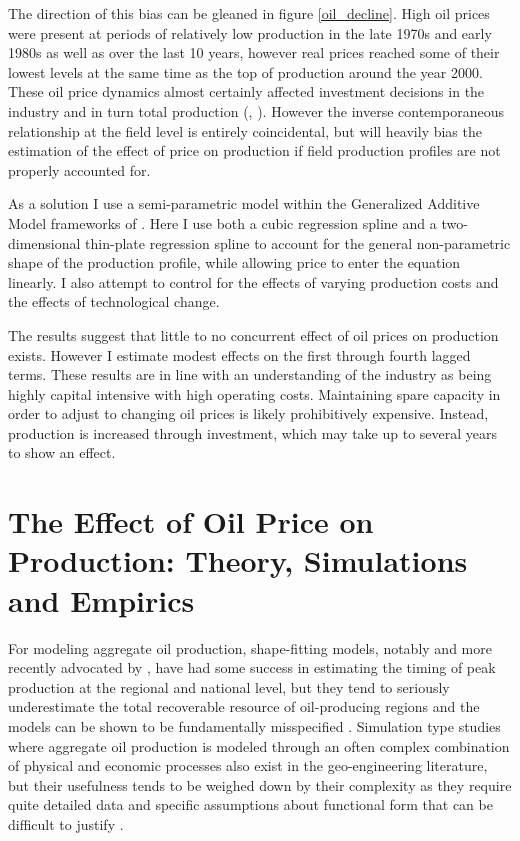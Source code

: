 \documentclass[11pt]{article}
\begin{document}
The direction of this bias can be gleaned in figure \ref{oil_decline}.  High oil prices were present at periods of relatively low production in the late 1970s and early 1980s as well as over the last 10 years, however real prices reached some of their lowest levels at the same time as the top of production around the year 2000. These oil price dynamics almost certainly affected investment decisions in the industry and in turn total production (\citep{osmundsen_is_2007}, \citep{aune_financial_2010}). However the inverse contemporaneous relationship at the field level is entirely coincidental, but will heavily bias the estimation of the effect of price on production if field production profiles are not properly accounted for. 

As a solution I use a semi-parametric model within the Generalized Additive Model frameworks of \cite{hastie_generalized_1990}.  Here I use both a cubic regression spline and a two-dimensional thin-plate regression spline to account for the general non-parametric shape of the production profile, while allowing price to enter the equation linearly. I also attempt to control for the effects of varying production costs and the effects of technological change.

The results suggest that little to no concurrent effect of oil prices on production exists.  However I estimate modest effects on the first through fourth lagged terms. These results are in line with an understanding of the industry as being highly capital intensive with high operating costs.  Maintaining spare capacity in order to adjust to changing oil prices is likely prohibitively expensive.  Instead, production is increased through investment, which may take up to several years to show an effect.

\section{The Effect of Oil Price on Production: Theory, Simulations and Empirics}

For modeling aggregate oil production, shape-fitting models, notably \citet{hubbert_energy_1962} and more recently advocated by \citet{deffeyes_hubberts_2001}, have had some success in estimating the timing of peak production at the regional and national level, but they tend to seriously underestimate the total recoverable resource of oil-producing regions and the models can be shown to be fundamentally misspecified \citep{boyce_prediction_2013}.   Simulation type studies where aggregate oil production is modeled through an often complex combination of physical and economic processes also exist in the geo-engineering literature, but their usefulness tends to be weighed down by their complexity as they require quite detailed data and specific assumptions about functional form that can be difficult to justify \citep{brandt_review_2010}.
\end{document}
